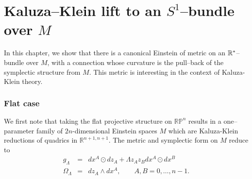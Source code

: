 
\chapter{Kaluza--Klein lift to an $S^1$--bundle over $M$}
\label{chap:KK_lift}
In this chapter, we show that there is a canonical Einstein of metric on an $\mathbb{R}^*$--bundle over $M$, with a connection whose curvature is the pull--back
of the symplectic structure from $M$. This metric is interesting in the context of Kaluza-Klein theory.

\subsection{Flat case}

We first note that taking the flat projective structure on $\mathbb{RP}^{n}$
results in a one--parameter family of $2n$-dimensional Einstein spaces $M$ which are Kaluza-Klein
reductions of quadrics in $\mathbb{R}^{n+1,n+1}$. The metric and symplectic form on $M$ reduce to 
\begin{eqnarray*}
g_{\Lambda} & = & {d}x^{A}\odot {d}z_{A}+\Lambda z_{A}z_B{d}x^{A}\odot dx^B\\
\Omega_{\Lambda} & = & {d}z_{A}\wedge{d}x^{A},\qquad A,B=0,\dots,n-1.
\end{eqnarray*}

